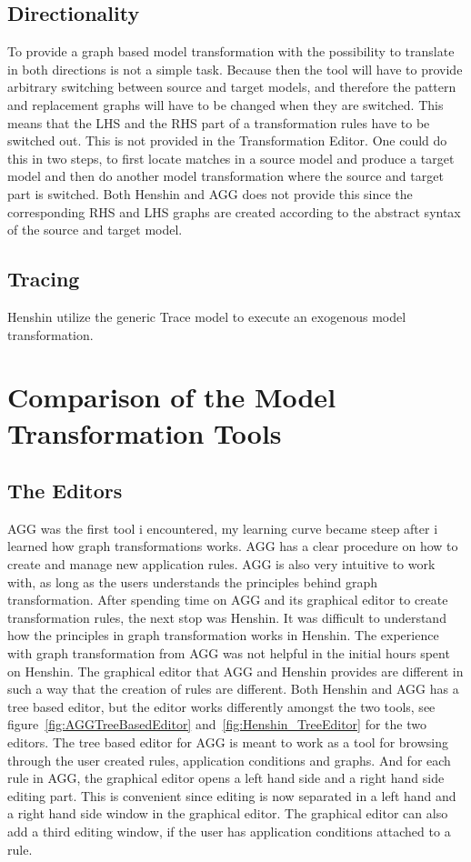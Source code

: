 \subsection{Directionality}

To provide a graph based model transformation with the possibility to translate
in both directions is not a simple task. Because then the tool will have to
provide arbitrary switching between source and target models, and therefore the
pattern and replacement graphs will have to be changed when they are switched.
This means that the LHS and the RHS part of a transformation rules have to be
switched out. This is not provided in the Transformation Editor. One could do
this in two steps, to first locate matches in a source model and produce a
target model and then do another model transformation where the source and
target part is switched. Both Henshin and AGG does not provide this since the
corresponding RHS and LHS graphs are created according to the abstract syntax of
the source and target model. 

\subsection{Tracing}

Henshin utilize the generic Trace model to execute an exogenous model
transformation. 

\section{Comparison of the Model Transformation Tools}
\label{comparison}

\subsection{The Editors}
AGG was the first tool i encountered, my learning curve became steep after i
learned how graph transformations works. AGG has a clear procedure on how to create and
manage new application rules. AGG is also very intuitive to work with, as long
as the users understands the principles behind graph transformation.
After spending time on AGG and its graphical editor to create transformation rules, the next
stop was Henshin. It was difficult to understand how the principles in graph
transformation works in Henshin. The experience with graph transformation from
AGG was not helpful in the initial hours spent on Henshin. The graphical editor
that AGG and Henshin provides are different in such a way that the creation of
rules are different. Both Henshin and AGG has a tree based editor, but the
editor works differently amongst the two tools, see
figure~\ref{fig:AGGTreeBasedEditor} and~\ref{fig:Henshin_TreeEditor} for the
two editors. The tree based editor for AGG is meant to work as a tool for
browsing through the user created rules, application conditions and graphs. And
for each rule in AGG, the graphical editor opens a left hand side and a right
hand side editing part. This is convenient since editing is now separated in a
left hand and a right hand side window in the graphical editor. The graphical editor can also
add a third editing window, if the user has application conditions attached to a
rule. 

